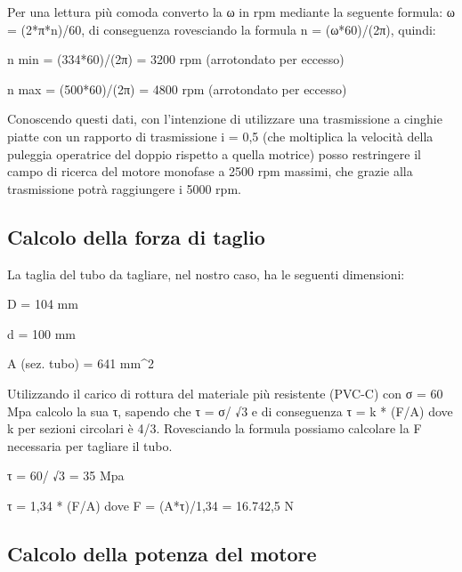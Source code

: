 \documentclass{report}
\begin{document}
Per una lettura più comoda converto la ω in rpm mediante la seguente formula: ω = (2*π*n)/60, di conseguenza rovesciando la formula n = (ω*60)/(2π), quindi:

\begin{description}
\item n min = (334*60)/(2π) = 3200 rpm (arrotondato per eccesso)
\item n max = (500*60)/(2π) = 4800 rpm (arrotondato per eccesso)
\end{description}

Conoscendo questi dati, con l’intenzione di utilizzare una trasmissione a cinghie piatte con un rapporto di trasmissione i = 0,5 (che moltiplica la velocità della puleggia operatrice del doppio rispetto a quella motrice) posso restringere il campo di ricerca del motore monofase a 2500 rpm massimi, che grazie alla trasmissione potrà raggiungere i 5000 rpm.

\subsection{Calcolo della forza di taglio}

La taglia del tubo da tagliare, nel nostro caso, ha le seguenti dimensioni:

\begin{description}

\item D = 104 mm
\item d  = 100 mm
\item A (sez. tubo) = 641 mm^2

\end{description}

Utilizzando il carico di rottura del materiale più resistente (PVC-C) con σ = 60 Mpa calcolo la sua τ, sapendo che τ = σ/ √3 e di conseguenza τ = k * (F/A) dove k per sezioni circolari è 4/3. Rovesciando la formula possiamo calcolare la F necessaria per tagliare il tubo.

\begin{description}

\item τ = 60/ √3 = 35 Mpa
\item τ = 1,34 * (F/A) dove F = (A*τ)/1,34 = 16.742,5 N

\end{description}

\subsection{Calcolo della potenza del motore}
\end{document}
